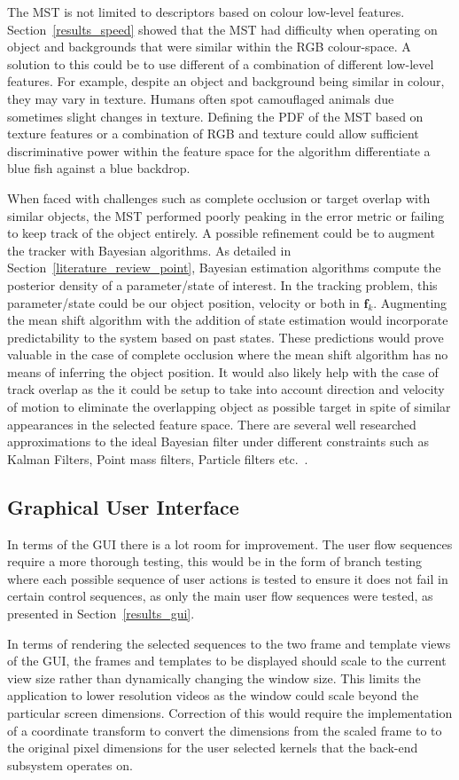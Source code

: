 The MST is not limited to descriptors based on colour low-level features.
Section~\ref{results_speed} showed that the MST had difficulty when operating on
object and backgrounds that were similar within the RGB colour-space. A solution
to this could be to use different of a combination of different low-level
features. For example, despite an object and background being similar in colour,
they may vary in texture. Humans often spot camouflaged animals due sometimes
slight changes in texture. 
Defining the PDF of the MST based on texture features or a combination of RGB
and texture could allow sufficient discriminative power within the feature space
for the algorithm differentiate a blue fish against a blue backdrop.

When faced with challenges such as complete occlusion or target overlap with
similar objects, the MST performed poorly peaking in the error metric or failing
to keep track of the object entirely. A possible refinement could be to augment
the tracker with Bayesian algorithms. As detailed in
Section~\ref{literature_review_point}, Bayesian estimation algorithms compute
the posterior density of a parameter/state of interest. In the tracking
problem, this parameter/state could be our object position, velocity or both in
$\mathbf{f}_k$. 
Augmenting the mean shift algorithm with the addition of state estimation  would
incorporate predictability to the system based on past states. These predictions
would prove valuable in the case of complete occlusion where the mean shift
algorithm has no means of inferring the object position. It would also likely
help with the case of track overlap as the it could be setup to take into
account direction and velocity of motion to eliminate the overlapping object as
possible target in spite of similar appearances in the selected
feature space.
There are several well researched approximations to the ideal Bayesian filter
under different constraints such as Kalman Filters, Point mass filters, Particle
filters etc.~\cite{Challa2011}.  

\subsection{Graphical User Interface}
In terms of the GUI there is a lot room for improvement. The user flow sequences
require a more thorough testing, this would be in the form of branch testing where
each possible sequence of user actions is tested to ensure it does not fail in
certain control sequences, as only the main user flow sequences were tested, as
presented in Section~\ref{results_gui}.

In terms of rendering the selected sequences to the two frame and template views
of the GUI, the frames and templates to be displayed should scale to the current
view size rather than dynamically changing the window size. This limits the
application to lower resolution videos as the window could scale beyond the
particular screen dimensions.
Correction of this would require the implementation of a coordinate transform
to convert the dimensions from the scaled frame to to the original pixel
dimensions for the user selected kernels that the back-end subsystem operates on.

